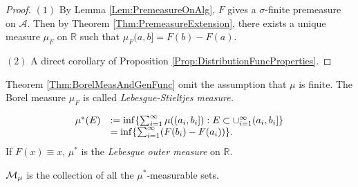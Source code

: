 \begin{proof}
    $(1)$ By Lemma \ref{Lem:PremeasureOnAlg}, $F$ gives a 
    $\sigma$-finite premeasure on $\mathcal{A}$. 
    Then by Theorem \ref{Thm:PremeasureExtension}, there exists a 
    unique measure $\mu_{F}$ on $\mathbb{R}$ such that 
    $\mu_{F}(a,b]=F(b)-F(a)$.

    $(2)$ A direct corollary of Proposition 
    \ref{Prop:DistributionFuncProperties}.
\end{proof}
\begin{rem}
    Theorem \ref{Thm:BorelMeasAndGenFunc} 
    omit the assumption that $\mu$ is finite. 
    The Borel measure $\mu_{F}$ is called 
    \textit{Lebesgue-Stieltjes measure.} 
\end{rem}
\begin{rem}
    \begin{displaymath}
        \begin{array}{rl}
            \mu^{*}(E)&:=\inf\{\sum_{i=1}^{\infty}\mu((a_i,b_i]):
            E\subset\cup_{i=1}^{\infty}(a_i,b_i]\}\\
            &=\inf\{\sum_{i=1}^{\infty}(F(b_i)-F(a_i))\}.\\
        \end{array}
    \end{displaymath}
    If $F(x)\equiv x$, $\mu^{*}$ is the \textit{Lebesgue 
    outer measure }on $\mathbb{R}$. 
\end{rem}
\begin{ntn}
    $\mathcal{M}_{\mu}$ is the collection of all the $\mu^{*}$-measurable 
    sets.
\end{ntn}